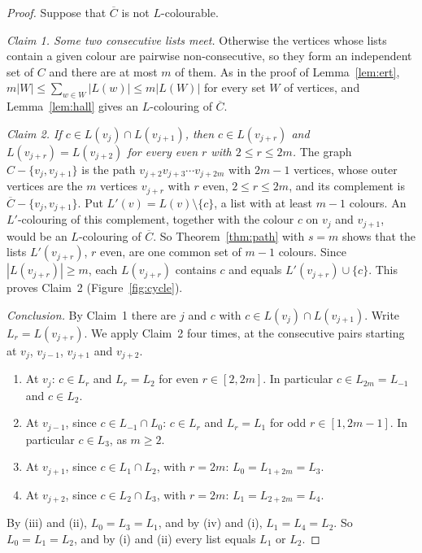\documentclass[11pt,a4paper,reqno]{amsart}
\theoremstyle{definition}
\theoremstyle{remark}
\begin{document}
\begin{proof}
Suppose that $\overline C$ is not $L$-colourable.

\smallskip\noindent\emph{Claim 1. Some two consecutive lists meet.} Otherwise the vertices whose lists contain a given colour are pairwise non-consecutive, so they form an independent set of $C$ and there are at most $m$ of them. As in the proof of Lemma~\ref{lem:ert}, $m|W|\le\sum_{w\in W}|L(w)|\le m|L(W)|$ for every set $W$ of vertices, and Lemma~\ref{lem:hall} gives an $L$-colouring of $\overline C$.

\smallskip\noindent\emph{Claim 2. If $c\in L(v_j)\cap L(v_{j+1})$, then $c\in L(v_{j+r})$ and $L(v_{j+r})=L(v_{j+2})$ for every even $r$ with $2\le r\le2m$.} The graph $C-\{v_j,v_{j+1}\}$ is the path $v_{j+2}v_{j+3}\cdots v_{j+2m}$ with $2m-1$ vertices, whose outer vertices are the $m$ vertices $v_{j+r}$ with $r$ even, $2\le r\le 2m$, and its complement is $\overline C-\{v_j,v_{j+1}\}$. Put $L'(v)=L(v)\setminus\{c\}$, a list with at least $m-1$ colours. An $L'$-colouring of this complement, together with the colour $c$ on $v_j$ and $v_{j+1}$, would be an $L$-colouring of $\overline C$. So Theorem~\ref{thm:path} with $s=m$ shows that the lists $L'(v_{j+r})$, $r$ even, are one common set of $m-1$ colours. Since $|L(v_{j+r})|\ge m$, each $L(v_{j+r})$ contains $c$ and equals $L'(v_{j+r})\cup\{c\}$. This proves Claim~2 (Figure~\ref{fig:cycle}).

\smallskip\noindent\emph{Conclusion.} By Claim~1 there are $j$ and $c$ with $c\in L(v_j)\cap L(v_{j+1})$. Write $L_r=L(v_{j+r})$. We apply Claim~2 four times, at the consecutive pairs starting at $v_j$, $v_{j-1}$, $v_{j+1}$ and $v_{j+2}$.
\begin{enumerate}
\item[(i)] At $v_j$: $c\in L_r$ and $L_r=L_2$ for even $r\in[2,2m]$. In particular $c\in L_{2m}=L_{-1}$ and $c\in L_2$.
\item[(ii)] At $v_{j-1}$, since $c\in L_{-1}\cap L_0$: $c\in L_r$ and $L_r=L_1$ for odd $r\in[1,2m-1]$. In particular $c\in L_3$, as $m\ge2$.
\item[(iii)] At $v_{j+1}$, since $c\in L_1\cap L_2$, with $r=2m$: $L_0=L_{1+2m}=L_3$.
\item[(iv)] At $v_{j+2}$, since $c\in L_2\cap L_3$, with $r=2m$: $L_1=L_{2+2m}=L_4$.
\end{enumerate}
By (iii) and (ii), $L_0=L_3=L_1$, and by (iv) and (i), $L_1=L_4=L_2$. So $L_0=L_1=L_2$, and by (i) and (ii) every list equals $L_1$ or $L_2$.
\end{proof}
\end{document}

